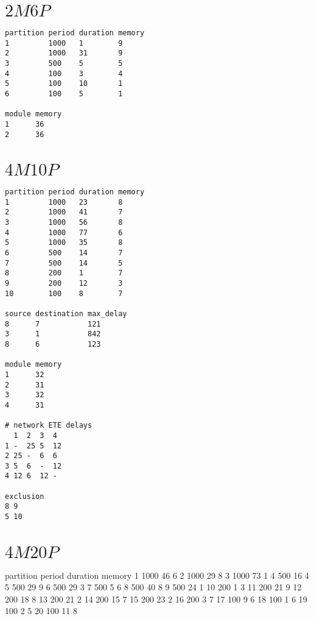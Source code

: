 \section{\texorpdfstring{$2M6P$}{2M6P}}

\begin{verbatim}
partition period duration memory
1         1000   1        9
2         1000   31       9
3         500    5        5
4         100    3        4
5         100    10       1
6         100    5        1

module memory
1      36
2      36
\end{verbatim}

\section{\texorpdfstring{$4M10P$}{4M10P}}

\begin{verbatim}
partition period duration memory
1         1000   23       8
2         1000   41       7
3         1000   56       8
4         1000   77       6
5         1000   35       8
6         500    14       7
7         500    14       5
8         200    1        7
9         200    12       3
10        100    8        7

source destination max_delay
8      7           121
3      1           842
8      6           123

module memory
1      32
2      31
3      32
4      31

# network ETE delays
  1  2  3  4
1 -  25 5  12
2 25 -  6  6
3 5  6  -  12
4 12 6  12 -

exclusion
8 9
5 10
\end{verbatim}

\section{\texorpdfstring{$4M20P$}{4M20P}}

partition period duration memory
1         1000   46       6
2         1000   29       8
3         1000   73       1
4         500    16       4
5         500    29       9
6         500    29       3
7         500    5        6
8         500    40       8
9         500    24       1
10        200    1        3
11        200    21       9
12        200    18       8
13        200    21       2
14        200    15       7
15        200    23       2
16        200    3        7
17        100    9        6
18        100    1        6
19        100    2        5
20        100    11       8

